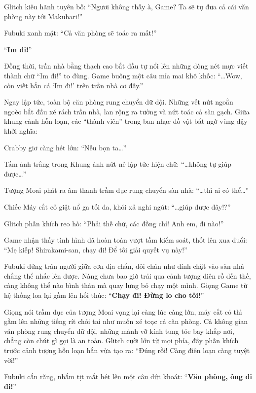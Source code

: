 \documentclass[../main.tex]{subfiles}
\begin{document}
Glitch kiêu hãnh tuyên bố: ``Ngươi không thấy à, Game? Ta sẽ tự đưa cả cái văn phòng này tới Makuhari!''

Fubuki xanh mặt: ``Cả văn phòng sẽ toác ra mất!''

``\textbf{Im đi!}''

Đồng thời, trần nhà bằng thạch cao bắt đầu tự nổi lên những dòng nét mực viết thành chữ ``Im đi!'' to đùng. Game buông một câu mỉa mai khô khốc: ``\dots Wow, còn viết hẳn cả `Im đi!' trên trần nhà cơ đấy.''


Ngay lập tức, toàn bộ căn phòng rung chuyển dữ dội. Những vết nứt ngoằn ngoèo bắt đầu xé rách trần nhà, lan rộng ra tường và nứt toác cả sàn gạch. Giữa khung cảnh hỗn loạn, các ``thành viên'' trong ban nhạc đồ vật bất ngờ vùng dậy khởi nghĩa:

Crabby giơ càng hét lớn: ``Nếu bọn ta\dots''

Tấm ảnh trắng trong Khung ảnh nứt nẻ lập tức hiện chữ: ``\dots không tự giúp được\dots''

Tượng Moai phát ra âm thanh trầm đục rung chuyển sàn nhà: ``\dots thì ai có thể\dots''

Chiếc Máy cắt cỏ giật nổ ga tối đa, khói xả nghi ngút: ``\dots giúp được đây!?''


Glitch phấn khích reo hò: ``Phải thế chứ, các đồng chí! Anh em, đi nào!''

Game nhận thấy tình hình đã hoàn toàn vượt tầm kiểm soát, thốt lên xua đuổi: ``Mẹ kiếp! Shirakami-san, chạy đi! Để tôi giải quyết vụ này!''

Fubuki đứng trân người giữa cơn địa chấn, đôi chân như dính chặt vào sàn nhà chẳng thể nhấc lên được. Nàng chưa bao giờ trải qua cảnh tượng điên rồ đến thế, càng không thể nào bình thản mà quay lưng bỏ chạy một mình. Giọng Game từ hệ thống loa lại gầm lên hối thúc: ``\textbf{Chạy đi! Đừng lo cho tôi!}''

Giọng nói trầm đục của tượng Moai vọng lại càng lúc càng lớn, máy cắt cỏ thì gầm lên những tiếng rít chói tai như muốn xé toạc cả căn phòng. Cả không gian văn phòng rung chuyển dữ dội, những mảnh vỡ kính tung tóe bay khắp nơi, chẳng còn chút gì gọi là an toàn. Glitch cười lớn từ mọi phía, đầy phấn khích trước cảnh tượng hỗn loạn hắn vừa tạo ra: ``Đúng rồi! Càng điên loạn càng tuyệt vời!''

Fubuki cắn răng, nhắm tịt mắt hét lên một câu dứt khoát: ``\textbf{Văn phòng, ông đi đi!}''
\end{document}

